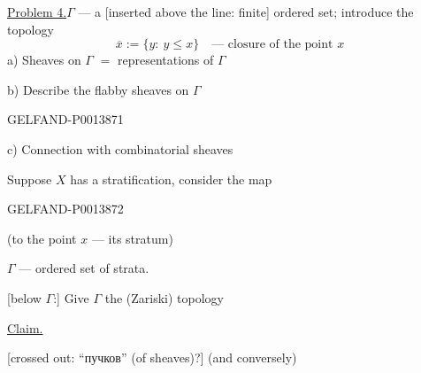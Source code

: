 \uline{Problem 4.}\quad \(\Gamma\) --- a
[inserted above the line: finite] ordered set; introduce the topology
\[
\overline{x}:=\{y:\ y\leq x\}\quad\text{--- closure of the point }x
\]
a) Sheaves on \(\Gamma\) \(=\) representations of \(\Gamma\)

b) Describe the flabby sheaves on \(\Gamma\)


\begin{GelfandAdjacentEvidence}{GELFAND-P001387}{1}

c) Connection with combinatorial sheaves

Suppose \(X\) has a stratification, consider the map
\end{GelfandAdjacentEvidence}
\begin{GelfandAdjacentEvidence}{GELFAND-P001387}{2}

(to the point \(x\) --- its stratum)

\(\Gamma\) --- ordered set of strata.

[below \(\Gamma\):] Give \(\Gamma\) the (Zariski) topology

\uline{Claim.}

[crossed out: “пучков” (of sheaves)?]
(and conversely)


\end{GelfandAdjacentEvidence}
